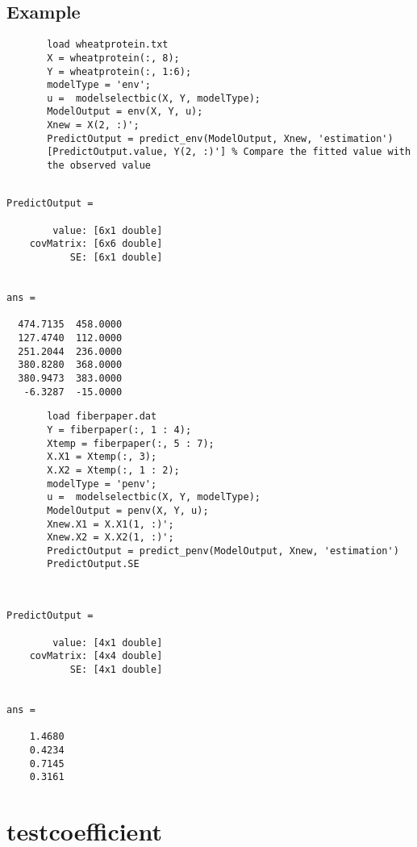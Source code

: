 \documentclass[a4paper,11pt,openany]{memoir}
\begin{document}
\subsection*{Example}


\begin{verbatim}       load wheatprotein.txt
       X = wheatprotein(:, 8);
       Y = wheatprotein(:, 1:6);
       modelType = 'env';
       u =  modelselectbic(X, Y, modelType);
       ModelOutput = env(X, Y, u);
       Xnew = X(2, :)';
       PredictOutput = predict_env(ModelOutput, Xnew, 'estimation')
       [PredictOutput.value, Y(2, :)'] % Compare the fitted value with
       the observed value\end{verbatim}
             \color{lightgray}\ttfamily \begin{verbatim}

PredictOutput = 

        value: [6x1 double]
    covMatrix: [6x6 double]
           SE: [6x1 double]


ans =

  474.7135  458.0000
  127.4740  112.0000
  251.2044  236.0000
  380.8280  368.0000
  380.9473  383.0000
   -6.3287  -15.0000

\end{verbatim} \rmfamily
\color{black}
    
   
\begin{verbatim}       load fiberpaper.dat
       Y = fiberpaper(:, 1 : 4);
       Xtemp = fiberpaper(:, 5 : 7);
       X.X1 = Xtemp(:, 3);
       X.X2 = Xtemp(:, 1 : 2);
       modelType = 'penv';
       u =  modelselectbic(X, Y, modelType);
       ModelOutput = penv(X, Y, u);
       Xnew.X1 = X.X1(1, :)';
       Xnew.X2 = X.X2(1, :)';
       PredictOutput = predict_penv(ModelOutput, Xnew, 'estimation')
       PredictOutput.SE\end{verbatim}
    

        \color{lightgray}\ttfamily \begin{verbatim}


PredictOutput = 

        value: [4x1 double]
    covMatrix: [4x4 double]
           SE: [4x1 double]


ans =

    1.4680
    0.4234
    0.7145
    0.3161

\end{verbatim} \rmfamily
\color{black}
 
    
\newpage

\rmfamily
\color{black}\section{testcoefficient}
\end{document}
